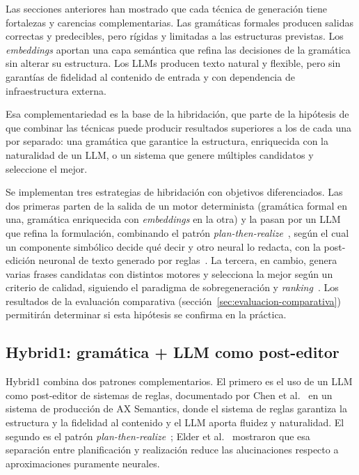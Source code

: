 Las secciones anteriores han mostrado que cada técnica de generación tiene fortalezas y carencias complementarias. Las gramáticas formales producen salidas correctas y predecibles, pero rígidas y limitadas a las estructuras previstas. Los \textit{embeddings} aportan una capa semántica que refina las decisiones de la gramática sin alterar su estructura. Los LLMs producen texto natural y flexible, pero sin garantías de fidelidad al contenido de entrada y con dependencia de infraestructura externa.

Esa complementariedad es la base de la hibridación, que parte de la hipótesis de que combinar las técnicas puede producir resultados superiores a los de cada una por separado: una gramática que garantice la estructura, enriquecida con la naturalidad de un LLM, o un sistema que genere múltiples candidatos y seleccione el mejor.

Se implementan tres estrategias de hibridación con objetivos diferenciados. Las dos primeras parten de la salida de un motor determinista (gramática formal en una, gramática enriquecida con \textit{embeddings} en la otra) y la pasan por un LLM que refina la formulación, combinando el patrón \textit{plan-then-realize}~\cite{moryossef2019stepbystep}, según el cual un componente simbólico decide qué decir y otro neural lo redacta, con la post-edición neuronal de texto generado por reglas~\cite{chen2025axsemantics}. La tercera, en cambio, genera varias frases candidatas con distintos motores y selecciona la mejor según un criterio de calidad, siguiendo el paradigma de sobregeneración y \textit{ranking}~\cite{sharma2019overgenerate}. Los resultados de la evaluación comparativa (sección~\ref{sec:evaluacion-comparativa}) permitirán determinar si esta hipótesis se confirma en la práctica.

\subsection{Hybrid1: gramática + LLM como post-editor}
\label{sec:h-hybrid1}

Hybrid1 combina dos patrones complementarios. El primero es el uso de un LLM como post-editor de sistemas de reglas, documentado por Chen et al.~\cite{chen2025axsemantics} en un sistema de producción de AX Semantics, donde el sistema de reglas garantiza la estructura y la fidelidad al contenido y el LLM aporta fluidez y naturalidad. El segundo es el patrón \textit{plan-then-realize}~\cite{moryossef2019stepbystep}; Elder et al.~\cite{elder2019intermediate} mostraron que esa separación entre planificación y realización reduce las alucinaciones respecto a aproximaciones puramente neurales.

